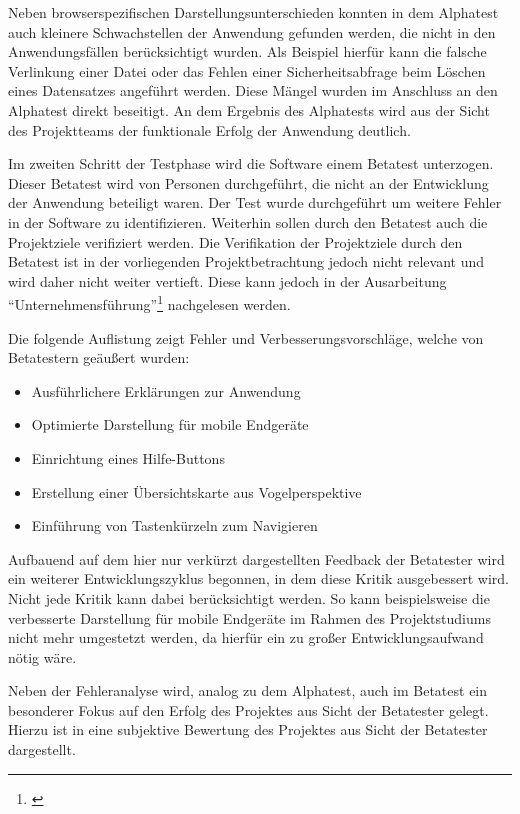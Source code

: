 Neben browserspezifischen Darstellungsunterschieden konnten in dem Alphatest
auch kleinere Schwachstellen der Anwendung gefunden werden, die nicht in den
Anwendungsfällen berücksichtigt wurden. Als Beispiel hierfür kann die falsche
Verlinkung einer Datei oder das Fehlen einer Sicherheitsabfrage beim Löschen
eines Datensatzes angeführt werden. Diese Mängel wurden im Anschluss an den
Alphatest direkt beseitigt. An dem Ergebnis des Alphatests wird aus der Sicht
des Projektteams der funktionale Erfolg der Anwendung deutlich.

Im zweiten Schritt der Testphase wird die Software einem Betatest unterzogen.
Dieser Betatest wird von Personen durchgeführt, die nicht an der Entwicklung der
Anwendung beteiligt waren. Der Test wurde durchgeführt um weitere Fehler in der
Software zu identifizieren. Weiterhin sollen durch den Betatest auch die
Projektziele verifiziert werden. Die Verifikation der Projektziele durch den
Betatest ist in der vorliegenden Projektbetrachtung jedoch nicht relevant und
wird daher nicht weiter vertieft. Diese kann jedoch in der Ausarbeitung
"`Unternehmensführung"'\footnote{\citet{unternehmensfuehrung2014}} nachgelesen
werden. 

Die folgende Auflistung zeigt Fehler und Verbesserungsvorschläge, welche von
Betatestern geäußert wurden:

\begin{itemize}
  \item Ausführlichere Erklärungen zur Anwendung
  \item Optimierte Darstellung für mobile Endgeräte
  \item Einrichtung eines Hilfe-Buttons
  \item Erstellung einer Übersichtskarte aus Vogelperspektive
  \item Einführung von Tastenkürzeln zum Navigieren
\end{itemize}

Aufbauend auf dem hier nur verkürzt dargestellten Feedback der Betatester wird
ein weiterer Entwicklungszyklus begonnen, in dem diese Kritik ausgebessert wird.
Nicht jede Kritik kann dabei berücksichtigt werden. So kann beispielsweise die
verbesserte Darstellung für mobile Endgeräte im Rahmen des Projektstudiums nicht
mehr umgestetzt werden, da hierfür ein zu großer Entwicklungsaufwand nötig wäre.

Neben der Fehleranalyse wird, analog zu dem Alphatest, auch im Betatest ein
besonderer Fokus auf den Erfolg des Projektes aus Sicht der Betatester gelegt.
Hierzu ist in  eine subjektive Bewertung des Projektes aus
Sicht der Betatester dargestellt.

